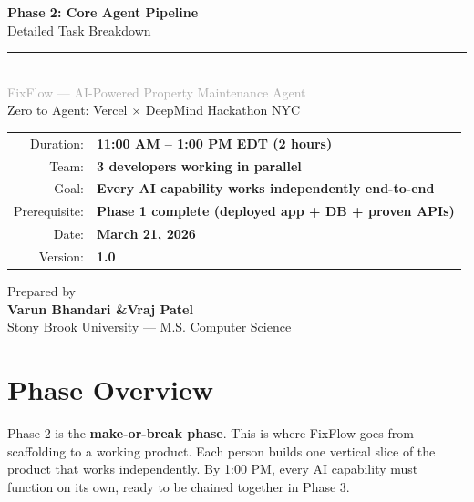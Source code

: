 \documentclass[11pt, a4paper]{article}
\begin{document}
\begin{titlepage}
\centering
\vspace*{2cm}

{\Huge\bfseries\textcolor{primary}{Phase 2: Core Agent Pipeline}}\\[0.6cm]
{\LARGE\textcolor{accent}{Detailed Task Breakdown}}\\[0.3cm]
\textcolor{accent}{\rule{0.6\textwidth}{1.5pt}}\\[1cm]

{\Large\textcolor{darkgray}{FixFlow --- AI-Powered Property Maintenance Agent}}\\[0.5cm]
{\large\textcolor{textmuted}{Zero to Agent: Vercel $\times$ DeepMind Hackathon NYC}}\\[2cm]

\begin{tabular}{rl}
\textcolor{textmuted}{Duration:} & \textbf{11:00 AM -- 1:00 PM EDT (2 hours)} \\[6pt]
\textcolor{textmuted}{Team:} & \textbf{3 developers working in parallel} \\[6pt]
\textcolor{textmuted}{Goal:} & \textbf{Every AI capability works independently end-to-end} \\[6pt]
\textcolor{textmuted}{Prerequisite:} & \textbf{Phase 1 complete (deployed app + DB + proven APIs)} \\[6pt]
\textcolor{textmuted}{Date:} & \textbf{March 21, 2026} \\[6pt]
\textcolor{textmuted}{Version:} & \textbf{1.0} \\
\end{tabular}

\vfill

{\normalsize\textcolor{textmuted}{Prepared by}}\\[4pt]
{\large\textbf{Varun Bhandari \quad\&\quad Vraj Patel}}\\[2pt]
{\small\textcolor{textmuted}{Stony Brook University --- M.S. Computer Science}}

\end{titlepage}

\section{Phase Overview}

Phase 2 is the \textbf{make-or-break phase}. This is where FixFlow goes from scaffolding to a working product. Each person builds one vertical slice of the product that works independently. By 1:00 PM, every AI capability must function on its own, ready to be chained together in Phase 3.
\end{document}
